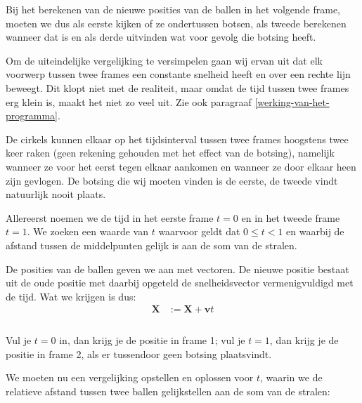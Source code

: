 \documentclass[12pt,a4paper]{article}
\begin{document}
	Bij het berekenen van de nieuwe posities van de ballen in het volgende frame, moeten we dus als eerste kijken of ze ondertussen botsen, als tweede berekenen wanneer dat is en als derde uitvinden wat voor gevolg die botsing heeft.
	
	Om de uiteindelijke vergelijking te versimpelen gaan wij ervan uit dat elk voorwerp tussen twee frames een constante snelheid heeft en over een rechte lijn beweegt. Dit klopt niet met de realiteit, maar omdat de tijd tussen twee frames erg klein is, maakt het niet zo veel uit. Zie ook paragraaf \ref{werking-van-het-programma}.
	
	De cirkels kunnen elkaar op het tijdsinterval tussen twee frames hoogstens twee keer raken (geen rekening gehouden met het effect van de botsing), namelijk wanneer ze voor het eerst tegen elkaar aankomen en wanneer ze door elkaar heen zijn gevlogen. De botsing die wij moeten vinden is de eerste, de tweede vindt natuurlijk nooit plaats.
	
	Allereerst noemen we de tijd in het eerste frame $t=0$ en in het tweede frame $t=1$. We zoeken een waarde van $t$ waarvoor geldt dat $0 \le t < 1$ en waarbij de afstand tussen de middelpunten gelijk is aan de som van de stralen.
	
	De posities van de ballen geven we aan met vectoren. De nieuwe positie bestaat uit de oude positie met daarbij opgeteld de snelheidsvector vermenigvuldigd met de tijd. Wat we krijgen is dus:
	\begin{equation}
		\begin{aligned}
			\mathbf{X} &:= \mathbf{X} + \mathbf{v}t\\
		\end{aligned}
	\end{equation}
	\\Vul je $t=0$ in, dan krijg je de positie in frame 1; vul je $t=1$, dan krijg je de positie in frame 2, als er tussendoor geen botsing plaatsvindt.
	
	We moeten nu een vergelijking opstellen en oplossen voor $t$, waarin we de relatieve afstand tussen twee ballen gelijkstellen aan de som van de stralen:
	
\end{document}
